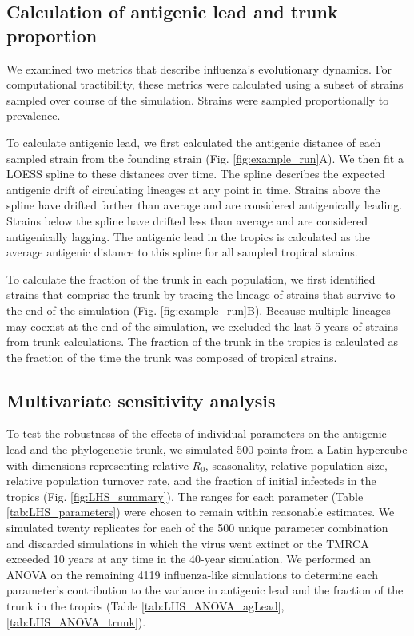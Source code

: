 \documentclass[10pt]{article}
\begin{document}
\subsection{Calculation of antigenic lead and trunk proportion}
We examined two metrics that describe influenza's evolutionary dynamics.
For computational tractibility, these metrics were calculated using a subset of strains sampled over course of the simulation.
Strains were sampled proportionally to prevalence.

To calculate antigenic lead, we first calculated the antigenic distance of each sampled strain from the founding strain (Fig. \ref{fig:example_run}A).
We then fit a LOESS spline to these distances over time.
The spline describes the expected antigenic drift of circulating lineages at any point in time.
Strains above the spline have drifted farther than average and are considered antigenically leading.
Strains below the spline have drifted less than average and are considered antigenically lagging.
The antigenic lead in the tropics is calculated as the average antigenic distance to this spline for all sampled tropical strains.

To calculate the fraction of the trunk in each population, we first identified strains that comprise the trunk by tracing the lineage of strains that survive to the end of the simulation (Fig. \ref{fig:example_run}B). 
Because multiple lineages may coexist at the end of the simulation, we excluded the last 5 years of strains from trunk calculations.
The fraction of the trunk in the tropics is calculated as the fraction of the time the trunk was composed of tropical strains.

\subsection{Multivariate sensitivity analysis}
To test the robustness of the effects of individual parameters on the antigenic lead and the phylogenetic trunk, we simulated 500 points from a Latin hypercube with dimensions representing relative $R_0$, seasonality, relative population size, relative population turnover rate, and the fraction of initial infecteds in the tropics (Fig. \ref{fig:LHS_summary}). 
The ranges for each parameter (Table \ref{tab:LHS_parameters}) were chosen to remain within reasonable estimates. 
We simulated twenty replicates for each of the 500 unique parameter combination and discarded simulations in which the virus went extinct or the TMRCA exceeded 10 years at any time in the 40-year simulation.
We performed an ANOVA on the remaining 4119 influenza-like simulations to determine each parameter's contribution to the variance in antigenic lead and the fraction of the trunk in the tropics (Table \ref{tab:LHS_ANOVA_agLead}, \ref{tab:LHS_ANOVA_trunk}).
\end{document}
